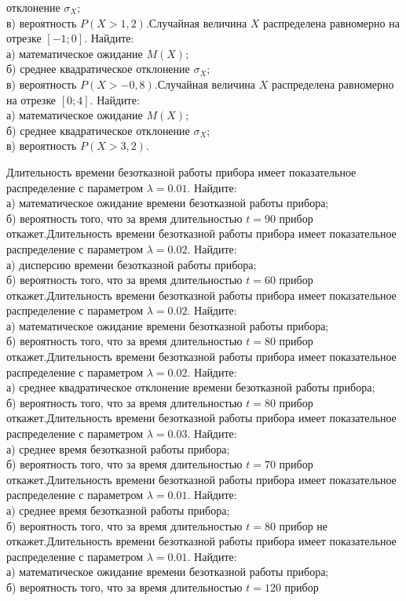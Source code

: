 отклонение $\sigma_X$; \\ \quad в) вероятность $P(X>1{,}2)$.Случайная величина $X$ распределена равномерно на отрезке $[-1; 0]$. Найдите: \\ \quad а) математическое ожидание $M(X)$; \\ \quad б) среднее квадратическое отклонение $\sigma_X$; \\ \quad в) вероятность $P(X>-0{,}8)$.Случайная величина $X$ распределена равномерно на отрезке $[0; 4]$. Найдите: \\ \quad а) математическое ожидание $M(X)$; \\ \quad б) среднее квадратическое отклонение $\sigma_X$; \\ \quad в) вероятность $P(X>3{,}2)$.

\vfill

\z Длительность времени безотказной работы прибора имеет показательное распределение с параметром $\lambda = 0.01$. Найдите: \\ \quad а) математическое ожидание времени безотказной работы прибора; \\ \quad б) вероятность того, что за время длительностью $t = 90$ прибор откажет.Длительность времени безотказной работы прибора имеет показательное распределение с параметром $\lambda = 0.02$. Найдите: \\ \quad а) дисперсию времени безотказной работы прибора; \\ \quad б) вероятность того, что за время длительностью $t = 60$ прибор откажет.Длительность времени безотказной работы прибора имеет показательное распределение с параметром $\lambda = 0.02$. Найдите: \\ \quad а) математическое ожидание времени безотказной работы прибора; \\ \quad б) вероятность того, что за время длительностью $t = 80$ прибор откажет.Длительность времени безотказной работы прибора имеет показательное распределение с параметром $\lambda = 0.02$. Найдите: \\ \quad а) среднее квадратическое отклонение времени безотказной работы прибора; \\ \quad б) вероятность того, что за время длительностью $t = 80$ прибор откажет.Длительность времени безотказной работы прибора имеет показательное распределение с параметром $\lambda = 0.03$. Найдите: \\ \quad а) среднее время безотказной работы прибора; \\ \quad б) вероятность того, что за время длительностью $t = 70$ прибор откажет.Длительность времени безотказной работы прибора имеет показательное распределение с параметром $\lambda = 0.01$. Найдите: \\ \quad а) среднее время безотказной работы прибора; \\ \quad б) вероятность того, что за время длительностью $t = 80$ прибор не откажет.Длительность времени безотказной работы прибора имеет показательное распределение с параметром $\lambda = 0.01$. Найдите: \\ \quad а) математическое ожидание времени безотказной работы прибора; \\ \quad б) вероятность того, что за время длительностью $t = 120$ прибор 